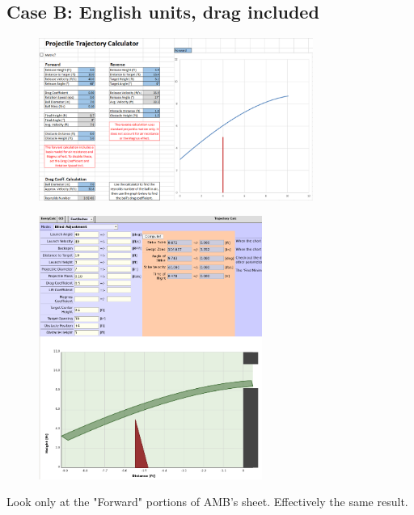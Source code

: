 \documentclass[10pt,letterpaper]{article}
\begin{document}
	\subsection*{Case B: English units, drag included}
	\begin{figure}[H]
		\includegraphics[width=0.8\textwidth]{validation/trajectory_AMB_B.png}
	\end{figure}

	\begin{figure}[H]
		\includegraphics[width=0.65\textwidth]{validation/trajectory_EC_B.png}
	\end{figure}

	Look only at the "Forward" portions of AMB's sheet. Effectively the same result.
	
\end{document}
